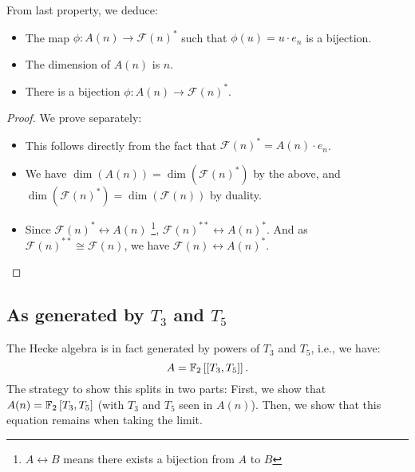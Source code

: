 \begin{corollary}
	From last property, we deduce:
	\begin{itemize}
		\item The map $\phi: A(n) \to \mathcal{F}(n)^*$ such that $\phi(u) = u \cdot e_n$ is a bijection.
		\item The dimension of $A(n)$ is $n$.
		\item There is a bijection $\phi: A(n) \to \mathcal{F}(n)^*$.
	\end{itemize}
\end{corollary}
\begin{proof}
	We prove separately:
	\begin{itemize}
		\item This follows directly from the fact that $\mathcal{F}(n)^* = A(n) \cdot e_n$.
		\item We have $\dim(A(n)) = \dim(\mathcal{F}(n)^*)$ by the above, and $\dim(\mathcal{F}(n)^*) = \dim(\mathcal{F}(n))$ by duality.
		\item Since $\mathcal{F}(n)^* \leftrightarrow A(n)$
		\footnote{$A \leftrightarrow B$ means there exists a bijection from $A$ to $B$}, $\mathcal{F}(n)^{**} \leftrightarrow A(n)^*$.
		And as $\mathcal{F}(n)^{**} \cong \mathcal{F}(n)$, we have $\mathcal{F}(n) \leftrightarrow A(n)^*$.
	\end{itemize}
\end{proof}



\subsection{As generated by $T_3$ and $T_5$}
The Hecke algebra is in fact generated by powers of $T_3$ and $T_5$, i.e., we have:
$$
A = \mathbb{F}_2 \left[\left[ T_3, T_5 \right]\right] .
$$
The strategy to show this splits in two parts:
First, we show that $A(n) = \mathbb{F}_2 \left[ T_3, T_5 \right]$ (with $T_3$ and $T_5$ seen in $A(n)$).
Then, we show that this equation remains when taking the limit.

